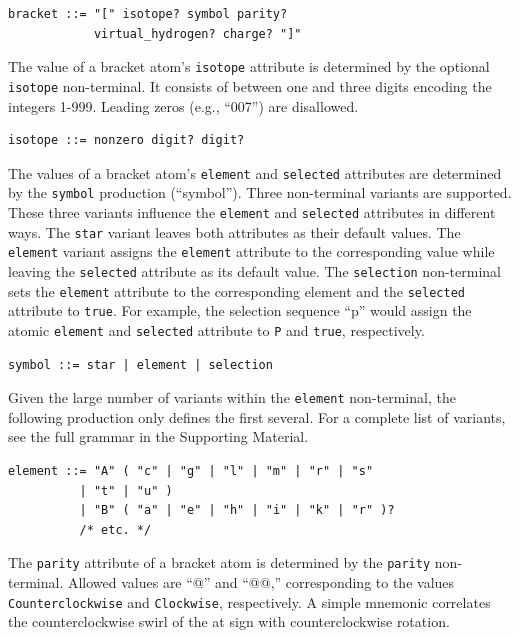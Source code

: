 \documentclass{article}
\def\ttt{\texttt}
\begin{document}
\begin{lstlisting}
bracket ::= "[" isotope? symbol parity?
            virtual_hydrogen? charge? "]"
\end{lstlisting}

The value of a bracket atom's \ttt{isotope} attribute is determined by the optional \ttt{isotope} non-terminal. It consists of between one and three digits encoding the integers 1-999. Leading zeros (e.g., \enquote{007}) are disallowed.

\begin{lstlisting}
isotope ::= nonzero digit? digit?
\end{lstlisting}

The values of a bracket atom's \ttt{element} and \ttt{selected} attributes are determined by the \ttt{symbol} production (\enquote{symbol}). Three non-terminal variants are supported. These three variants influence the \ttt{element} and \ttt{selected} attributes in different ways. The \ttt{star} variant leaves both attributes as their default values. The \ttt{element} variant assigns the \ttt{element} attribute to the corresponding value while leaving the \ttt{selected} attribute as its default value. The \ttt{selection} non-terminal sets the \ttt{element} attribute to the corresponding element and the \ttt{selected} attribute to \ttt{true}. For example, the selection sequence \enquote{p} would assign the atomic \ttt{element} and \ttt{selected} attribute to \ttt{P} and \ttt{true}, respectively.

\begin{lstlisting}
symbol ::= star | element | selection
\end{lstlisting}

Given the large number of variants within the \ttt{element} non-terminal, the following production only defines the first several. For a complete list of variants, see the full grammar in the Supporting Material.

\begin{lstlisting}
element ::= "A" ( "c" | "g" | "l" | "m" | "r" | "s"
          | "t" | "u" )
          | "B" ( "a" | "e" | "h" | "i" | "k" | "r" )?
          /* etc. */
\end{lstlisting}

The \ttt{parity} attribute of a bracket atom is determined by the \ttt{parity} non-terminal. Allowed values are \enquote{@} and \enquote{@@,} corresponding to the values \ttt{Counterclockwise} and \ttt{Clockwise}, respectively. A simple mnemonic correlates the counterclockwise swirl of the at sign with counterclockwise rotation.
\end{document}
